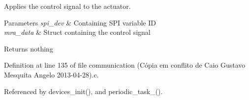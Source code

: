 Applies the control signal to the actuator. 


\begin{DoxyParams}{Parameters}
{\em spi\-\_\-dev} & Containing S\-P\-I variable I\-D \\
\hline
{\em mra\-\_\-data} & Struct containing the control signal \\
\hline
\end{DoxyParams}
\begin{DoxyReturn}{Returns}
nothing 
\end{DoxyReturn}


Definition at line 135 of file communication (\-Cópia em conflito de Caio Gustavo Mesquita Angelo 2013-\/04-\/28).\-c.



Referenced by devices\-\_\-init(), and periodic\-\_\-task\-\_().



